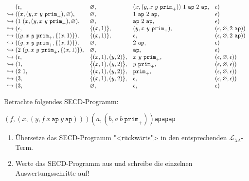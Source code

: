 \begin{displaymath}
  \begin{array}{l@{}llll}
&(\epsilon, &\varnothing, &(x, (y, x~y~\mathtt{prim}_+))~1~\mathtt{ap}~2~\mathtt{ap}, &\epsilon)\\
\hookrightarrow{}&((x, (y, x~y~\mathtt{prim}_+), \varnothing), &\varnothing, &1~\mathtt{ap}~2~\mathtt{ap}, &\epsilon)\\
\hookrightarrow{}&(1~(x, (y, x~y~\mathtt{prim}_+), \varnothing), &\varnothing, &\mathtt{ap}~2~\mathtt{ap}, &\epsilon)\\
\hookrightarrow{}&(\epsilon, &\{(x, 1)\}, &(y, x~y~\mathtt{prim}_+), &(\epsilon, \varnothing, 2~\mathtt{ap}))\\
\hookrightarrow{}&((y, x~y~\mathtt{prim}_+, \{(x, 1)\}), &\{(x, 1)\}, &\epsilon, &(\epsilon, \varnothing, 2~\mathtt{ap}))\\
\hookrightarrow{}&((y, x~y~\mathtt{prim}_+, \{(x, 1)\}), &\varnothing, &2~\mathtt{ap}, &\epsilon)\\
\hookrightarrow{}&(2~(y, x~y~\mathtt{prim}_+, \{(x, 1)\}), &\varnothing, &\mathtt{ap}, &\epsilon)\\
\hookrightarrow{}&(\epsilon, &\{(x, 1), (y, 2)\}, &x~y~\mathtt{prim}_+, &(\epsilon, \varnothing, \epsilon))\\
\hookrightarrow{}&(1, &\{(x, 1), (y, 2)\}, &y~\mathtt{prim}_+, &(\epsilon, \varnothing, \epsilon))\\
\hookrightarrow{}&(2~1, &\{(x, 1), (y, 2)\}, &\mathtt{prim}_+, &(\epsilon, \varnothing, \epsilon))\\
\hookrightarrow{}&(3, &\{(x, 1), (y, 2)\}, &\epsilon, &(\epsilon, \varnothing, \epsilon))\\
\hookrightarrow{}&(3, &\varnothing, &\epsilon, &\epsilon)
  \end{array}
\end{displaymath}
%
\begin{aufgabeinline}
 Betrachte folgendes SECD-Programm:
 
 \newcommand{\tuple}[2]{\ensuremath{(#1,#2)}}

 \begin{center}
   \tuple{f}{\tuple{x}{\tuple{y}{f\:x\:\texttt{ap}\:y\:\texttt{ap}}}}\:\tuple{a}{\tuple{b}{a\:b\:\texttt{prim}_+}}\:\texttt{ap}\:\texttt{ap}\:\texttt{ap}
 \end{center}
 
 \begin{enumerate}
   \item Übersetze das SECD-Programm "<rückwärts"> in den entsprechenden
   $\mathcal{L}_{\lambda{}A}$-Term.
   \item Werte das SECD-Programm aus und schreibe die einzelnen
     Auswertungsschritte auf!
 \end{enumerate}
\end{aufgabeinline}
